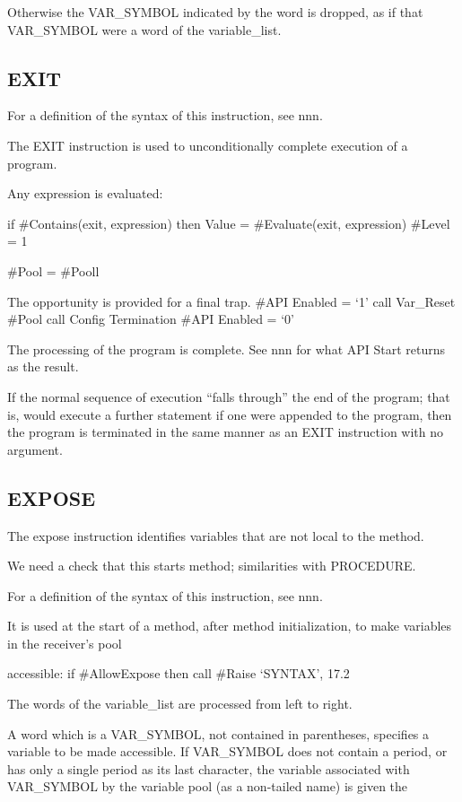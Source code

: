 Otherwise the VAR\_SYMBOL indicated by the word is dropped, as if that
VAR\_SYMBOL were a word of the variable\_list.

\hypertarget{exit}{%
\subsection{EXIT}\label{exit}}

For a definition of the syntax of this instruction, see nnn.

The EXIT instruction is used to unconditionally complete execution of a
program.

Any expression is evaluated:

if \#Contains(exit, expression) then Value = \#Evaluate(exit,
expression) \#Level = 1

\#Pool = \#Pooll

The opportunity is provided for a final trap. \#API Enabled = `1' call
Var\_Reset \#Pool call Config Termination \#API Enabled = `0'

The processing of the program is complete. See nnn for what API Start
returns as the result.

If the normal sequence of execution ``falls through'' the end of the
program; that is, would execute a further statement if one were appended
to the program, then the program is terminated in the same manner as an
EXIT instruction with no argument.

\hypertarget{expose}{%
\subsection{EXPOSE}\label{expose}}

The expose instruction identifies variables that are not local to the
method.

We need a check that this starts method; similarities with PROCEDURE.

For a definition of the syntax of this instruction, see nnn.

It is used at the start of a method, after method initialization, to
make variables in the receiver's pool

accessible: if \#AllowExpose then call \#Raise `SYNTAX', 17.2

The words of the variable\_list are processed from left to right.

A word which is a VAR\_SYMBOL, not contained in parentheses, specifies a
variable to be made accessible. If VAR\_SYMBOL does not contain a
period, or has only a single period as its last character, the variable
associated with VAR\_SYMBOL by the variable pool (as a non-tailed name)
is given the

